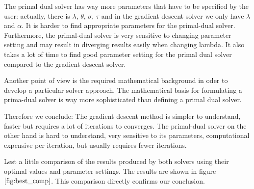 \documentclass{paper}
\begin{document}
The primal dual solver has way more parameters that have to be specified by the user: actually, there is $\lambda$, $\theta$, $\sigma$, $\tau$ and in the gradient descent solver we only have $\lambda$ and $\alpha$. It is harder to find appropriate parameters for the primal-dual solver. Furthermore, the primal-dual solver is very sensitive to changing parameter setting and may result in diverging results easily when changing lambda. It also takes a lot of time to find good parameter setting for the primal dual solver compared to the gradient descent solver. 

Another point of view is the required mathematical background in oder to develop a particular solver approach. The mathematical basis for formulating a prima-dual solver is way more sophisticated than defining a primal dual solver.

Therefore we conclude: The gradient descent method is simpler to understand, faster but requires a lot of iterations to converges. The primal-dual solver on the other hand is hard to understand, very sensitive to its parameters, computational expensive per iteration, but usually requires fewer iterations.

Lest a little comparison of the results produced by both solvers using their optimal values and parameter settings. The results are shown in figure $\ref{fig:best_comp}$. This comparison directly confirms our conclusion.
\end{document}
